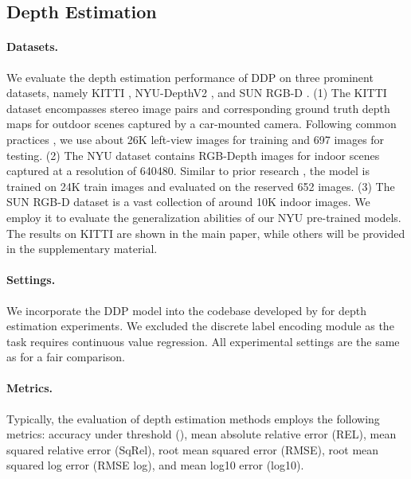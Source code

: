 \documentclass[10pt,twocolumn,letterpaper]{article}
\newcommand{\ours}[0]{DDP\xspace}
\begin{document}
\subsection{Depth Estimation}
\paragraph{Datasets.}
We evaluate the depth estimation performance of \ours on three prominent datasets, namely KITTI \cite{geiger2013vision}, NYU-DepthV2 \cite{silberman2012indoor}, and SUN RGB-D \cite{song2015sun}.
(1) The KITTI dataset encompasses stereo image pairs and corresponding ground truth depth maps for outdoor scenes captured by a car-mounted camera.
Following common practices \cite{eigen2014depth,li2022depthformer}, we use about 26K left-view images for training and 697 images for testing.
(2) The NYU dataset contains RGB-Depth images for indoor scenes captured at a resolution of 640480.
Similar to prior research \cite{li2022depthformer}, the model is trained on 24K train images and evaluated on the reserved 652 images.
(3) The SUN RGB-D dataset is a vast collection of around 10K indoor images. 
We employ it to evaluate the generalization abilities of our NYU pre-trained models.
The results on KITTI are shown in the main paper, while others will be provided in the supplementary material.
 

\paragraph{Settings.}
We incorporate the \ours model into the codebase developed by \cite{li2022depthformer} for depth estimation experiments.
We excluded the discrete label encoding module as the task requires continuous value regression.
All experimental settings are the same as \cite{li2022depthformer} for a fair comparison.

\paragraph{Metrics.}
Typically, the evaluation of depth estimation methods employs the following metrics: accuracy under threshold (), mean absolute relative error (REL), mean squared relative error (SqRel), root mean squared error (RMSE), root mean squared log error (RMSE log), and mean log10 error (log10).
\end{document}
